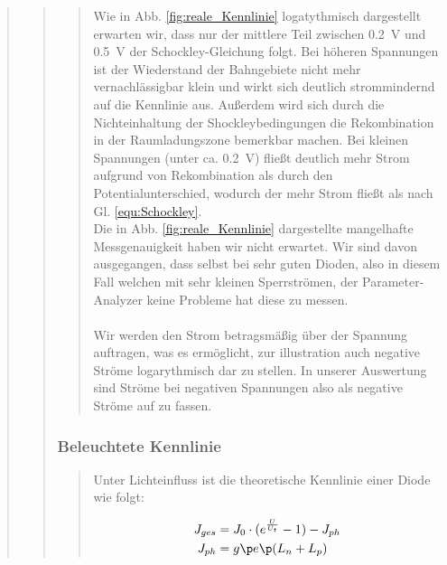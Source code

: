\begin{quote}
\begin{quote}
\begin{quote}
\vspace{2.5em}
            Wie in Abb. \ref{fig:reale_Kennlinie} logatythmisch dargestellt erwarten wir, dass nur der mittlere Teil
            zwischen \SI{0,2}{\volt} und \SI{0,5}{\volt} der Schockley-Gleichung folgt. Bei höheren Spannungen ist der
            Wiederstand der Bahngebiete nicht mehr vernachläs\-sigbar klein und wirkt sich deutlich strommindernd auf
            die Kennlinie aus. Außerdem wird sich durch die Nichteinhaltung der Shockleybedingungen die
            Rekombination in der Raumladungszone bemerkbar machen. Bei kleinen Spannungen (unter ca.
            \SI{0,2}{\volt}) fließt deutlich mehr Strom aufgrund von Rekombination als durch den Potentialunterschied,
            wodurch der mehr Strom fließt als nach Gl. \ref{equ:Schockley}.\\

            Die in Abb. \ref{fig:reale_Kennlinie} dargestellte mangelhafte Messgenauigkeit haben wir nicht erwartet. Wir
            sind davon ausgegangen, dass selbst bei sehr guten Dioden, also in diesem Fall welchen mit sehr kleinen
            Sperrströmen, der Parameter-Analyzer keine Probleme hat diese zu messen.\\
            \\
            Wir werden den Strom betragsmäßig über der Spannung auftragen, was es ermöglicht, zur illustration auch
            negative Ströme logarythmisch dar zu stellen. In unserer Auswertung sind Ströme bei negativen Spannungen
            also als negative Ströme auf zu fassen.

        \end{quote} %


        \subsubsection{Beleuchtete Kennlinie}
        \begin{quote}

            Unter Lichteinfluss ist die theoretische Kennlinie einer Diode wie folgt:

            \begin{equation}
            \begin{split}
            J_{ges} &= J_0 \cdot (e^ \frac{U}{U_t} -1) - J_{ph}\\
            J_{ph} &= g \p e \p (L_n + L_p)
            \end{split}
            \label{equ:Schockley_photo}
            \end{equation}


\end{quote}
\end{quote}
\end{quote}
